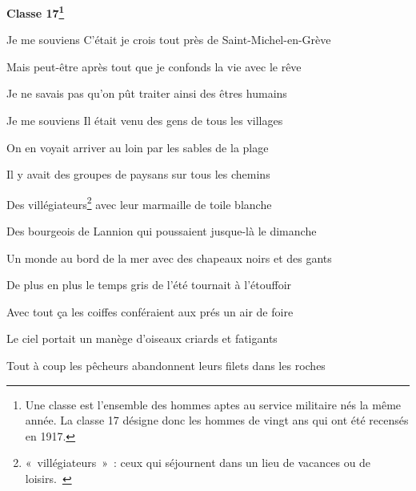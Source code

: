 {\setlength{\parskip}{0pt}
\begin{center}
\textbf{Classe 17\footnote{Une classe est l'ensemble des hommes aptes au service militaire nés la même année. La classe 17 désigne donc les hommes de vingt ans qui ont été recensés en 1917.}}
\end{center}

\bigskip

Je me souviens C'était je crois tout près de Saint-Michel-en-Grève

Mais peut-être après tout que je confonds la vie avec le rêve

\bigskip

Je ne savais pas qu'on pût traiter ainsi des êtres humains

\bigskip

Je me souviens Il était venu des gens de tous les villages

On en voyait arriver au loin par les sables de la plage

\bigskip

Il y avait des groupes de paysans sur tous les chemins

\bigskip

Des villégiateurs\footnote{«~villégiateurs~»~: ceux qui séjournent dans un 
lieu de vacances ou de loisirs.\vfill{~}} avec leur marmaille de toile blanche

Des bourgeois de Lannion qui poussaient jusque-là le dimanche

\bigskip

Un monde au bord de la mer avec des chapeaux noirs et des gants

\bigskip

De plus en plus le temps gris de l'été tournait à l'étouffoir

Avec tout ça les coiffes conféraient aux prés un air de foire

\bigskip

Le ciel portait un manège d'oiseaux criards et fatigants

\bigskip

Tout à coup les pêcheurs abandonnent leurs filets dans les roches

}
